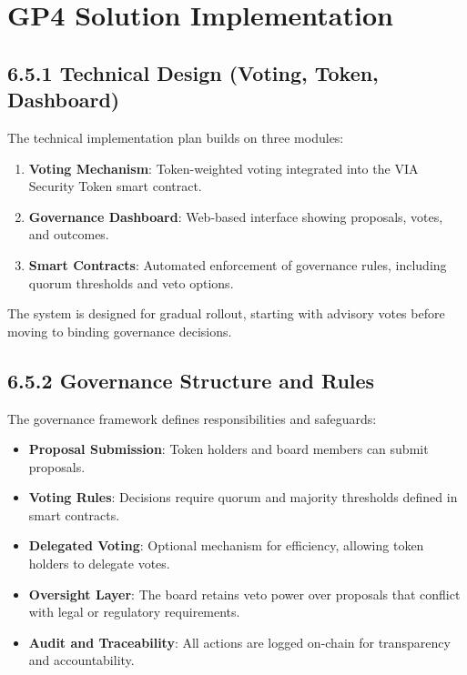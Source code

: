 \documentclass[
  english,
  12pt,
  oneside,
  open=any]{scrbook}
\providecommand{\tightlist}{%
  \setlength{\itemsep}{0pt}\setlength{\parskip}{0pt}}\usepackage{longtable,booktabs,array}
\begin{document}
\section{GP4 Solution Implementation}\label{sec-gp4}

\subsection{6.5.1 Technical Design (Voting, Token,
Dashboard)}\label{sec-tech}

The technical implementation plan builds on three modules:

\begin{enumerate}
\def\labelenumi{\arabic{enumi}.}
\tightlist
\item
  \textbf{Voting Mechanism}: Token-weighted voting integrated into the
  VIA Security Token smart contract.\\
\item
  \textbf{Governance Dashboard}: Web-based interface showing proposals,
  votes, and outcomes.\\
\item
  \textbf{Smart Contracts}: Automated enforcement of governance rules,
  including quorum thresholds and veto options.
\end{enumerate}

The system is designed for gradual rollout, starting with advisory votes
before moving to binding governance decisions.

\subsection{6.5.2 Governance Structure and Rules}\label{sec-structure}

The governance framework defines responsibilities and safeguards:

\begin{itemize}
\tightlist
\item
  \textbf{Proposal Submission}: Token holders and board members can
  submit proposals.\\
\item
  \textbf{Voting Rules}: Decisions require quorum and majority
  thresholds defined in smart contracts.\\
\item
  \textbf{Delegated Voting}: Optional mechanism for efficiency, allowing
  token holders to delegate votes.\\
\item
  \textbf{Oversight Layer}: The board retains veto power over proposals
  that conflict with legal or regulatory requirements.\\
\item
  \textbf{Audit and Traceability}: All actions are logged on-chain for
  transparency and accountability.
\end{itemize}
\end{document}
